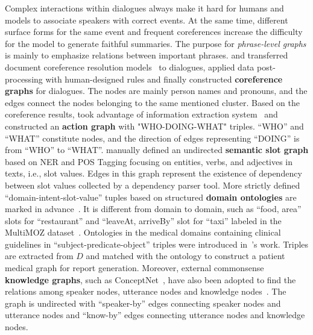 Complex interactions within dialogues always make it hard for humans and models to associate speakers with correct events. At the same time, different surface forms for the same event and frequent coreferences increase the difficulty for the model to generate faithful summaries. The purpose for \textit{phrase-level graphs} is mainly to emphasize relations between important phrases.
\citet{liu2021coreference} and \citet{liu2021controllable} transferred document coreference resolution models~\cite{joshi2020spanbert,lee2018higher} to dialogues,  applied data post-processing with human-designed rules and finally constructed \textbf{coreference graphs} for dialogues. The nodes are mainly person names and pronouns, and the edges connect the nodes belonging to the same mentioned cluster.
Based on the coreference results, \citet{chen2021structure} took advantage of information extraction system~\cite{angeli2015leveraging} and constructed an \textbf{action graph} with "WHO-DOING-WHAT" triples. ``WHO'' and ``WHAT'' constitute nodes, and the direction of edges representing ``DOING''  is from ``WHO'' to ``WHAT''.
\citet{zhao2021give} manually defined an undirected \textbf{semantic slot graph} based on NER and POS Tagging focusing on entities, verbs, and adjectives in texts, i.e., slot values. Edges in this graph represent the existence of dependency between slot values collected by a dependency parser tool.
More strictly defined ``domain-intent-slot-value'' tuples based on structured \textbf{domain ontologies} are marked in advance~\cite{yuan2019scaffolds,zhao2021todsum}. It is different from domain to domain, such as ``food, area'' slots 
for ``restaurant'' and ``leaveAt, arriveBy'' slot for ``taxi'' labeled in 
the MultiMOZ dataset~\cite{eric2019multiwoz}.
Ontologies in the medical domains containing clinical guidelines in 
``subject-predicate-object'' triples were introduced in~\citet{molennar2020healthcare}'s work. Triples are extracted from $D$ and matched with the ontology to construct a patient medical graph for report generation.
Moreover, external commonsense \textbf{knowledge graphs}, 
such as ConceptNet~\cite{speer2012representing}, have also been adopted to find the relations among speaker nodes, utterance nodes and knowledge nodes~\cite{feng2021incorporating}. The graph is undirected with ``speaker-by'' edges connecting speaker nodes and utterance nodes and ``know-by'' edges connecting utterance nodes and knowledge nodes.




